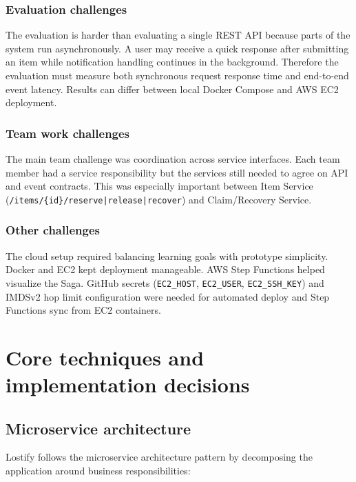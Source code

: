 \documentclass[11pt,a4paper]{article}
\begin{document}
\subsubsection{Evaluation challenges}

The evaluation is harder than evaluating a single REST API because parts of the system run
asynchronously. A user may receive a quick response after submitting an item while notification
handling continues in the background. Therefore the evaluation must measure both synchronous
request response time and end-to-end event latency. Results can differ between local Docker Compose
and AWS EC2 deployment.

\subsubsection{Team work challenges}

The main team challenge was coordination across service interfaces. Each team member had a
service responsibility but the services still needed to agree on API and event contracts. This was
especially important between Item Service (\texttt{/items/\{id\}/reserve|release|recover}) and
Claim/Recovery Service.

\subsubsection{Other challenges}

The cloud setup required balancing learning goals with prototype simplicity. Docker and EC2 kept
deployment manageable. AWS Step Functions helped visualize the Saga. GitHub secrets
(\texttt{EC2\_HOST}, \texttt{EC2\_USER}, \texttt{EC2\_SSH\_KEY}) and IMDSv2 hop limit configuration
were needed for automated deploy and Step Functions sync from EC2 containers.

\section{Core techniques and implementation decisions}

\subsection{Microservice architecture}

Lostify follows the microservice architecture pattern by decomposing the application around
business responsibilities:
\end{document}
